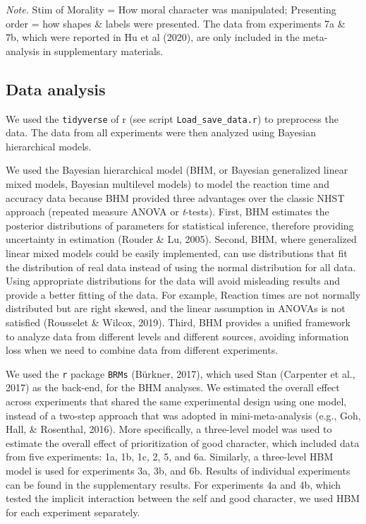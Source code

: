 \documentclass[
  man]{apa6}
\begin{document}
\begin{table}[tbp]
\begin{center}
\begin{threeparttable}
\begin{tablenotes}[para]
\normalsize{\textit{Note.} Stim of Morality = How moral character was manipulated; Presenting order = how shapes \& labels were presented. The data from experiments 7a \& 7b, which were reported in Hu et al (2020), are only included in the meta-analysis in supplementary materials.}
\end{tablenotes}

\end{threeparttable}
\end{center}

\end{table}

\hypertarget{data-analysis}{%
\subsection{Data analysis}\label{data-analysis}}

We used the \texttt{tidyverse} of r (see script \texttt{Load\_save\_data.r}) to preprocess the data. The data from all experiments were then analyzed using Bayesian hierarchical models.

We used the Bayesian hierarchical model (BHM, or Bayesian generalized linear mixed models, Bayesian multilevel models) to model the reaction time and accuracy data because BHM provided three advantages over the classic NHST approach (repeated measure ANOVA or \emph{t}-tests). First, BHM estimates the posterior distributions of parameters for statistical inference, therefore providing uncertainty in estimation (Rouder \& Lu, 2005). Second, BHM, where generalized linear mixed models could be easily implemented, can use distributions that fit the distribution of real data instead of using the normal distribution for all data. Using appropriate distributions for the data will avoid misleading results and provide a better fitting of the data. For example, Reaction times are not normally distributed but are right skewed, and the linear assumption in ANOVAs is not satisfied (Rousselet \& Wilcox, 2019). Third, BHM provides a unified framework to analyze data from different levels and different sources, avoiding information loss when we need to combine data from different experiments.

We used the \texttt{r} package \texttt{BRMs} (Bürkner, 2017), which used Stan (Carpenter et al., 2017) as the back-end, for the BHM analyses. We estimated the overall effect across experiments that shared the same experimental design using one model, instead of a two-step approach that was adopted in mini-meta-analysis (e.g., Goh, Hall, \& Rosenthal, 2016). More specifically, a three-level model was used to estimate the overall effect of prioritization of good character, which included data from five experiments: 1a, 1b, 1c, 2, 5, and 6a. Similarly, a three-level HBM model is used for experiments 3a, 3b, and 6b. Results of individual experiments can be found in the supplementary results. For experiments 4a and 4b, which tested the implicit interaction between the self and good character, we used HBM for each experiment separately.
\end{document}
